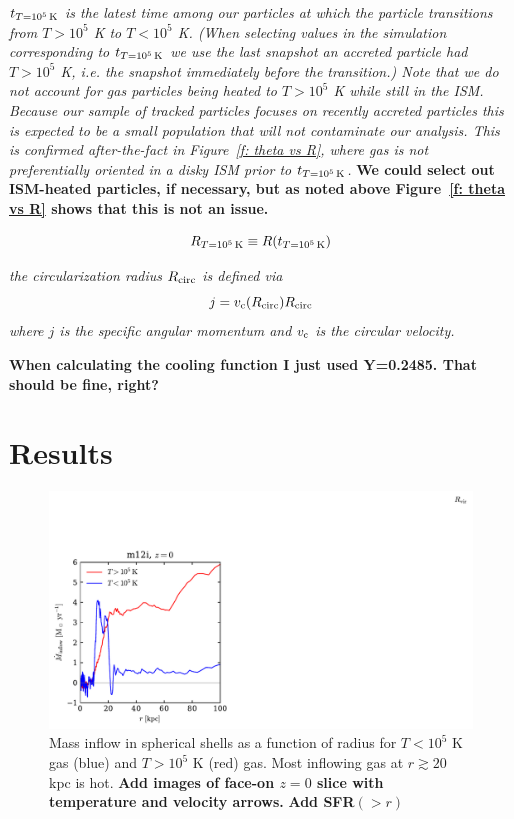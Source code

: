 \documentclass[fleqn,usenatbib]{mnras}
\newcommand{\Rcool}{R_{T=10^5\,{\rm K}}}
\newcommand{\tcon}{t_{T=10^5\,{\rm K}}}
\newcommand{\Rcirc}{R_{\rm circ}} %
\begin{document}
\textit{
$\tcon$ is the latest time among our particles at which the particle transitions from $T > 10^5$ K to $T< 10^5$ K.
(When selecting values in the simulation corresponding to $\tcon$ we use the last snapshot an accreted particle had $T > 10^5$ K, i.e. the snapshot immediately before the transition.)
Note that we do not account for gas particles being heated to $T > 10^5$ K while still in the ISM.
Because our sample of tracked particles focuses on recently accreted particles this is expected to be a small population that will not contaminate our analysis.
This is confirmed after-the-fact in Figure~\ref{f: theta vs R}, where gas is not preferentially oriented in a disky ISM prior to $\tcon$.
}
\textbf{We could select out ISM-heated particles, if necessary, but as noted above Figure~\ref{f: theta vs R} shows that this is not an issue.}

\begin{equation}
    \Rcool \equiv R(t_{T=10^5\,{\rm K}})
\end{equation}


\textit{the circularization radius $\Rcirc$ is defined via}
\begin{equation}
    j = v_{\rm c}(\Rcirc)\Rcirc
\end{equation}
\textit{where $j$ is the specific angular momentum and $v_{\rm c}$ is the circular velocity.}

\textbf{When calculating the cooling function I just used Y=0.2485. That should be fine, right?}

\section{Results}

\begin{figure}
    \centering
    \includegraphics{Mdot_m12i.pdf}
    \caption{
    Mass inflow in spherical shells as a function of radius for $T < 10^5$ K gas (blue) and $T>10^5$ K (red) gas.
    Most inflowing gas at $r\gtrsim 20 $ kpc is hot.
    \textbf{Add images of face-on $z=0$ slice with temperature and velocity arrows.}
    \textbf{Add SFR$(>r)$}
    }
    \label{f:Mdot}
\end{figure}
\end{document}
